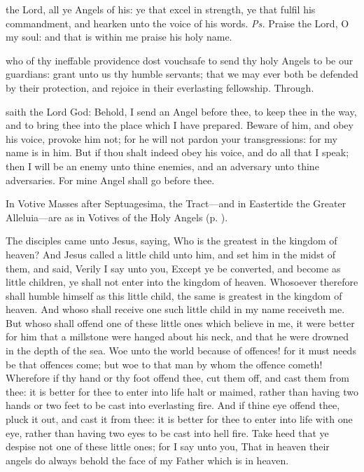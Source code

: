 \introit
{} the Lord, all ye Angels of his: ye that excel in strength, ye that fulfil his commandment, and hearken unto the voice of his words. \textit{Ps.} Praise the Lord, O my soul: and that is within me praise his holy name.

\collect
{} who of thy ineffable providence dost vouchsafe to send thy holy Angels to be our guardians: grant unto us thy humble servants; that we may ever both be defended by their protection, and rejoice in their everlasting fellowship. Through.

 saith the Lord God: Behold, I send an Angel before thee, to keep thee in the way, and to bring thee into the place which I have prepared. Beware of him, and obey his voice, provoke him not; for he will not pardon your transgressions: for my name is in him. But if thou shalt indeed obey his voice, and do all that I speak; then I will be an enemy unto thine enemies, and an adversary unto thine adversaries. For mine Angel shall go before thee.


\begin{rubric}
	In Votive Masses after Septuagesima, the Tract---and in Eastertide the Greater Alleluia---are as in Votives of the Holy Angels (p. \pageref{MassOfTheAngels}).
\end{rubric}

 The disciples came unto Jesus, saying, Who is the greatest in the kingdom of heaven? And Jesus called a little child unto him, and set him in the midst of them, and said, Verily I say unto you, Except ye be converted, and become as little children, ye shall not enter into the kingdom of heaven. Whosoever therefore shall humble himself as this little child, the same is greatest in the kingdom of heaven. And whoso shall receive one such little child in my name receiveth me. But whoso shall offend one of these little ones which believe in me, it were better for him that a millstone were hanged about his neck, and that he were drowned in the depth of the sea. Woe unto the world because of offences! for it must needs be that offences come; but woe to that man by whom the offence cometh! Wherefore if thy hand or thy foot offend thee, cut them off, and cast them from thee: it is better for thee to enter into life halt or maimed, rather than having two hands or two feet to be cast into everlasting fire. And if thine eye offend thee, pluck it out, and cast it from thee: it is better for thee to enter into life with one eye, rather than having two eyes to be cast into hell fire. Take heed that ye despise not one of these little ones; for I say unto you, That in heaven their angels do always behold the face of my Father which is in heaven.

